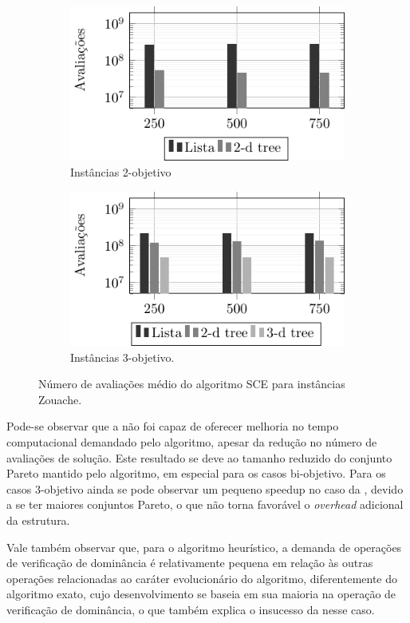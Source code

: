 \begin{figure}
\centering
\begin{subfigure}{.5\textwidth}
  \centering
  \includegraphics[scale=1.1]{tab/sce/cmpres2}
  \caption{Instâncias 2-objetivo}
  \label{fig:cmpsce2}
\end{subfigure}%
\begin{subfigure}{.5\textwidth}
  \centering
  \includegraphics[scale=1.1]{tab/sce/cmpres3}
  \caption{Instâncias 3-objetivo.}
  \label{fig:cmpsce3}
\end{subfigure}
\caption{Número de avaliações médio do algoritmo SCE para instâncias Zouache.}
\label{fig:cmpsce}
\end{figure}

Pode-se observar que a  não foi capaz de oferecer melhoria no tempo computacional
demandado pelo algoritmo, apesar da redução no número de avaliações de solução.
Este resultado se deve ao tamanho reduzido do conjunto Pareto mantido pelo algoritmo,
em especial para os casos bi-objetivo.
Para os casos 3-objetivo ainda se pode observar um pequeno speedup no
caso da , devido a se ter maiores conjuntos Pareto,
o que não torna favorável o \emph{overhead} adicional da estrutura.


Vale também observar que, para o algoritmo heurístico,
a demanda de operações de verificação
de dominância é relativamente pequena em relação às outras operações relacionadas
ao caráter evolucionário do algoritmo, diferentemente do algoritmo exato,
cujo desenvolvimento se baseia em sua maioria na operação de verificação de dominância,
o que também explica o insucesso da \kdtree{} nesse caso.